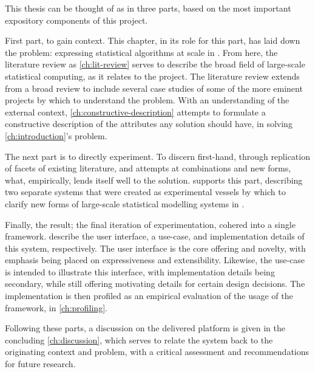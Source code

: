 This thesis can be thought of as in three parts, based on the most important expository components of this project.

First part, to gain context.
This chapter, in its role for this part, has laid down the problem: expressing statistical algorithms at scale in \R{}.
From here, the literature review as \cref{ch:lit-review} serves to describe the broad field of large-scale statistical computing, as it relates to the \lsr{} project.
The literature review extends from a broad review to include several case studies of some of the more eminent projects by which to understand the problem.
With an understanding of the external context, \cref{ch:constructive-description} attempts to formulate a constructive description of the attributes any solution should have, in solving \cref{ch:introduction}'s problem.

The next part is to directly experiment.
To discern first-hand, through replication of facets of existing literature, and attempts at combinations and new forms, what, empirically, lends itself well to the solution.
 supports this part, describing two separate systems that were created as experimental vessels by which to clarify new forms of large-scale statistical modelling systems in \R{}.

Finally, the result; the final iteration of experimentation, cohered into a single \lsr{} framework.
 describe the user interface, a use-case, and implementation details of this system, respectively.
The user interface is the core offering and novelty, with emphasis being placed on expressiveness and extensibility.
Likewise, the use-case is intended to illustrate this interface, with implementation details being secondary, while still offering motivating details for certain design decisions.
The implementation is then profiled as an empirical evaluation of the usage of the framework, in \cref{ch:profiling}.

Following these parts, a discussion on the delivered platform is given in the concluding \cref{ch:discussion}, which serves to relate the \lsr{} system back to the originating context and problem, with a critical assessment and recommendations for future research.
